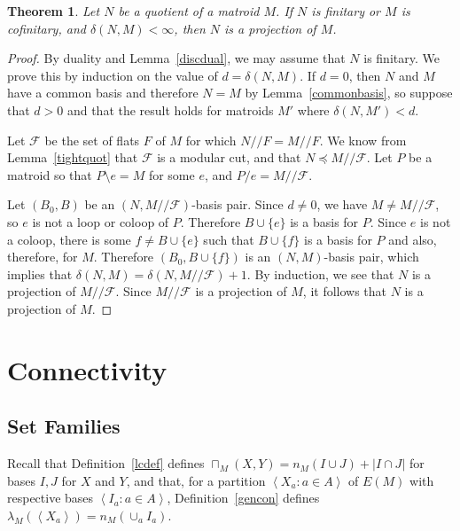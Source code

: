 \documentclass{amsart}
\theoremstyle{plain}
\newtheorem{theorem}{Theorem}[section]
\newtheorem{lemma}[theorem]{Lemma}
\theoremstyle{definition}
\newcommand{\cF}{\mathcal{F}}
\newcommand{\cY}{\mathcal{Y}}
\newcommand{\dcon}{/ \!\! /}
\newcommand{\del}{\!\setminus\!}
\newcommand{\con}{/}
\newcommand{\br}[1]{\left(#1\right)}
\newcommand{\ab}[1]{\left\langle#1\right\rangle}
\begin{document}
\begin{theorem}\label{quotientisproject}
  Let $N$ be a quotient of a matroid $M$. If $N$ is finitary or $M$ is cofinitary, and $\delta(N,M) < \infty$, 
  then $N$ is a projection of $M$. 
\end{theorem}
\begin{proof}
  By duality and Lemma~\ref{discdual},
  we may assume that $N$ is finitary. We prove this by induction on the value of $d = \delta(N,M)$. 
  If $d = 0$, then $N$ and $M$ have a common basis and therefore $N = M$ by Lemma~\ref{commonbasis}, 
  so suppose that $d > 0$ and that the result holds for matroids $M'$ where $\delta(N,M') < d$. 

  Let $\cF$ be the set of flats $F$ of $M$ for which $N \dcon F = M \dcon F$. 
  We know from Lemma~\ref{tightquot} that $\cF$ is a modular cut, and that $N \preceq M \dcon \cF$. 
  Let $P$ be a matroid so that $P \del e = M$ for some $e$, and $P \con e = M \dcon \cF$. 
  
  Let $(B_0,B)$ be an $(N, M \dcon \cF)$-basis pair. 
  Since $d \ne 0$, we have $M \ne M \dcon \cF$, so $e$ is not a loop or coloop of $P$. 
  Therefore $B \cup \{e\}$ is a basis for $P$. Since $e$ is not a coloop, there is some $f \ne B \cup \{e\}$ 
  such that $B \cup \{f\}$ is a basis for $P$ and also, therefore, for $M$. 
  Therefore $(B_0, B \cup \{f\})$ is an $(N,M)$-basis pair, which implies that $\delta(N,M) = \delta(N, M \dcon \cF) + 1$. 
  By induction, we see that $N$ is a projection of $M \dcon \cF$. Since $M \dcon \cF$ is a projection of $M$, 
  it follows that $N$ is a projection of $M$. 
\end{proof}



\section{Connectivity}

\subsection*{Set Families}
Recall that Definition~\ref{lcdef} defines $\sqcap_M(X,Y) = n_M(I \cup J) + |I \cap J|$ for 
bases $I,J$ for $X$ and $Y$, 
and that, for a partition $\ab{X_a : a \in A}$ of $E(M)$ with respective bases $\ab{I_a : a \in A}$, 
Definition~\ref{gencon} defines $\lambda_M\br{\ab{X_a}} = n_M(\cup_a I_a)$. 
\end{document}
